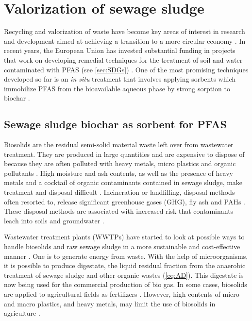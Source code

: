 \section{Valorization of sewage sludge}
Recycling and valorization of waste have become key areas of interest in research and development aimed at achieving a transition to a more circular economy \citep{Ahmad2014}. In recent years, the European Union has invested substantial funding in projects that work on developing remedial techniques for the treatment of soil and water contaminated with PFAS (see \cref{sec:SDGs}) \citep{EC2020PFAS,ECHA2020}. One of the most promising techniques developed so far is an \textit{in situ} treatment that involves applying sorbents which immobilize PFAS from the bioavailable aqueous phase by strong sorption to biochar \citep{Ahmad2014,Sormo2021,Kupryianchyk2016b}.

\subsection{Sewage sludge biochar as sorbent for PFAS}
Biosolids are the residual semi-solid material waste left over from wastewater treatment. They are produced in large quantities and are expensive to dispose of because they are often polluted with heavy metals, micro plastics and organic pollutants \citep{Raheem2018}. High moisture and ash contents, as well as the presence of heavy metals and a cocktail of organic contaminants contained in sewage sludge, make treatment and disposal difficult \citep{Li2019}. Incineration or landfilling, disposal methods often resorted to, release significant greenhouse gases (\acrshort{GHG}), fly ash and \acrshort{PAHs} \citep{huang2022comparative}. These disposal methods are associated with increased risk that contaminants leach into soils and groundwater \citep{propp2021organic}. 

Wastewater treatment plants (WWTPs) have started to look at possible ways to handle biosolids and raw sewage sludge in a more sustainable and cost-effective manner \citep{Raheem2018}. One is to generate energy from waste. With the help of microorganisms, it is possible to produce digestate, the liquid residual fraction from the anaerobic treatment of sewage sludge and other organic wastes (\cref{eq:AD}). This digestate is now being used for the commercial production of bio gas. In some cases, biosolids are applied to agricultural fields as fertilizers \citep{moodie2021legacy}. However, high contents of micro and macro plastics, and heavy metals, may limit the use of biosolids in agriculture \citep{mohajerani2020microplastics}.

